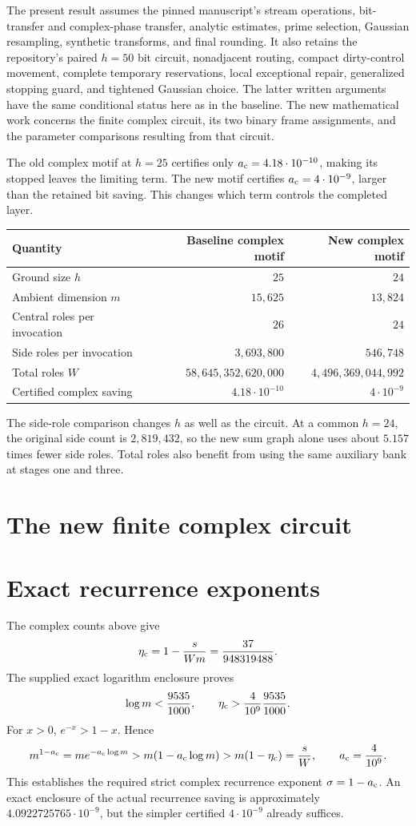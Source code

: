 \documentclass[11pt]{article}
\newcommand{\ac}{a_{\rm c}}
\begin{document}
The present result assumes the pinned manuscript's stream operations,
bit-transfer and complex-phase transfer, analytic estimates, prime
selection, Gaussian resampling, synthetic transforms, and final rounding.
It also retains the repository's paired $h=50$ bit circuit, nonadjacent
routing, compact dirty-control movement, complete temporary reservations,
local exceptional repair, generalized stopping guard, and tightened Gaussian
choice.  The latter written arguments have the same conditional status
here as in the baseline.  The new mathematical work concerns the finite
complex circuit, its two binary frame assignments, and the parameter
comparisons resulting from that circuit.

The old complex motif at $h=25$ certifies only
$\ac=4.18\cdot10^{-10}$, making its stopped leaves the limiting term.
The new motif certifies $\ac=4\cdot10^{-9}$, larger than the retained
bit saving.  This changes which term controls the completed layer.

\begin{center}
\begin{tabular}{@{}lrr@{}}
\toprule
Quantity & Baseline complex motif & New complex motif\\
\midrule
Ground size $h$ & $25$ & $24$\\
Ambient dimension $m$ & $15{,}625$ & $13{,}824$\\
Central roles per invocation & $26$ & $24$\\
Side roles per invocation & $3{,}693{,}800$ & $546{,}748$\\
Total roles $W$ & $58{,}645{,}352{,}620{,}000$ & $4{,}496{,}369{,}044{,}992$\\
Certified complex saving & $4.18\cdot10^{-10}$ & $4\cdot10^{-9}$\\
\bottomrule
\end{tabular}
\end{center}
The side-role comparison changes $h$ as well as the circuit.  At a common
$h=24$, the original side count is $2{,}819{,}432$, so the new sum graph
alone uses about $5.157$ times fewer side roles.  Total roles also benefit
from using the same auxiliary bank at stages one and three.

\section{The new finite complex circuit}


\section{Exact recurrence exponents}
The complex counts above give
\[
 \eta_{\rm c}=1-\frac{s}{Wm}=\frac{37}{948319488}.
\]
The supplied exact logarithm enclosure proves
\[
 \log m<\frac{9535}{1000},\qquad
 \eta_{\rm c}>\frac4{10^9}\frac{9535}{1000}.
\]
For $x>0$, $e^{-x}>1-x$.  Hence
\[
 m^{1-\ac}
 =m e^{-\ac\log m}
 >m(1-\ac\log m)>m(1-\eta_{\rm c})=\frac{s}{W},
 \qquad\ac=\frac4{10^9}.
\]
This establishes the required strict complex recurrence exponent
$\sigma=1-\ac$.  An exact enclosure of the actual recurrence saving is
approximately $4.0922725765\cdot10^{-9}$, but the simpler certified
$4\cdot10^{-9}$ already suffices.
\end{document}
